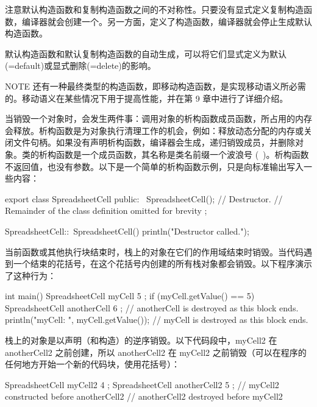 注意默认构造函数和复制构造函数之间的不对称性。只要没有显式定义复制构造函数，编译器就会创建一个。另一方面，定义了构造函数，编译器就会停止生成默认构造函数。

默认构造函数和默认复制构造函数的自动生成，可以将它们显式定义为默认(=default)或显式删除(=delete)的影响。

\begin{myNotic}{NOTE}
还有一种最终类型的构造函数，即移动构造函数，是实现移动语义所必需的。移动语义在某些情况下用于提高性能，并在第 9 章中进行了详细介绍。
\end{myNotic}


当销毁一个对象时，会发生两件事：调用对象的析构函数成员函数，所占用的内存会释放。析构函数是为对象执行清理工作的机会，例如：释放动态分配的内存或关闭文件句柄。如果没有声明析构函数，编译器会生成，递归销毁成员，并删除对象。类的析构函数是一个成员函数，其名称是类名前缀一个波浪号 (~)。析构函数不返回值，也没有参数。以下是一个简单的析构函数示例，只是向标准输出写入一些内容：

\begin{cpp}
export class SpreadsheetCell
{
    public:
        ~SpreadsheetCell(); // Destructor.
        // Remainder of the class definition omitted for brevity
};

SpreadsheetCell::~SpreadsheetCell()
{
    println("Destructor called.");
}
\end{cpp}

当前函数或其他执行块结束时，栈上的对象在它们的作用域结束时销毁。当代码遇到一个结束的花括号，在这个花括号内创建的所有栈对象都会销毁。以下程序演示了这种行为：

\begin{cpp}
int main()
{
    SpreadsheetCell myCell { 5 };
    if (myCell.getValue() == 5) {
        SpreadsheetCell anotherCell { 6 };
    } // anotherCell is destroyed as this block ends.
    println("myCell: {}", myCell.getValue());
} // myCell is destroyed as this block ends.
\end{cpp}

栈上的对象是以声明（和构造）的逆序销毁。以下代码段中，myCell2 在 anotherCell2 之前创建，所以 anotherCell2 在 myCell2 之前销毁（可以在程序的任何地方开始一个新的代码块，使用花括号）：

\begin{cpp}
{
    SpreadsheetCell myCell2 { 4 };
    SpreadsheetCell anotherCell2 { 5 }; // myCell2 constructed before anotherCell2
} // anotherCell2 destroyed before myCell2
\end{cpp}

